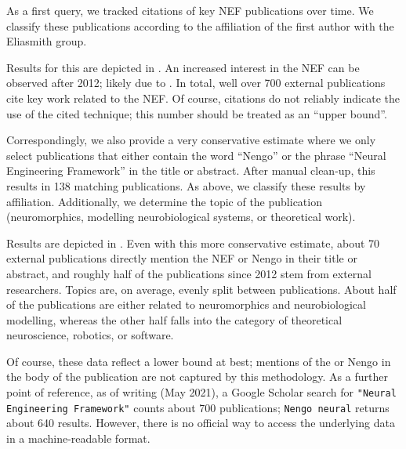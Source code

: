 As a first query, we tracked citations of key NEF publications \citep[specifically][]{eliasmith2003neural,eliasmith2013how,bekolay2014nengo} over time.
We classify these publications according to the affiliation of the first author with the Eliasmith group.

Results for this are depicted in .
An increased interest in the NEF can be observed after 2012; likely due to \citet{eliasmith2012largescale}.
In total, well over 700 external publications cite key work related to the NEF.
Of course, citations do not reliably indicate the use of the cited technique; this number should be treated as an \enquote{upper bound}.

Correspondingly, we also provide a very conservative estimate where we only select publications that either contain the word \enquote{Nengo} or the phrase \enquote{Neural Engineering Framework} in the title or abstract.
After manual clean-up, this results in 138 matching publications.
As above, we classify these results by affiliation.
Additionally, we determine the topic of the publication (neuromorphics, modelling neurobiological systems, or theoretical work).

Results are depicted in  .
Even with this more conservative estimate, about 70 external publications directly mention the NEF or Nengo in their title or abstract, and roughly half of the publications since 2012 stem from external researchers.
Topics are, on average, evenly split between publications.
About half of the publications are either related to neuromorphics and neurobiological modelling, whereas the other half falls into the category of theoretical neuroscience, robotics, or software.

Of course, these data reflect a lower bound at best; mentions of the \NEF or Nengo in the body of the publication are not captured by this methodology.
As a further point of reference, as of writing (May 2021), a Google Scholar search for \texttt{"Neural Engineering Framework"} counts about 700 publications; \texttt{Nengo neural} returns about 640 results.
However, there is no official way to access the underlying data in a machine-readable format.
